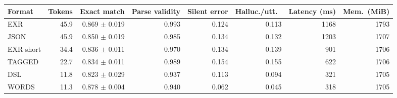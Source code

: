\begin{tabular}{lrrrrrrr}
\toprule
Format & Tokens & Exact match & Parse validity & \textbf{Silent error} & Halluc./utt.\ & Latency (ms) & Mem.\ (MiB) \\
\midrule
EXR & 45.9 & 0.869 {\scriptsize $\pm$ 0.019} & 0.993 & 0.124 & 0.113 & 1168 & 1793 \\
JSON & 45.9 & 0.850 {\scriptsize $\pm$ 0.019} & 0.985 & 0.134 & 0.132 & 1203 & 1707 \\
EXR-short & 34.4 & 0.836 {\scriptsize $\pm$ 0.011} & 0.970 & 0.134 & 0.139 & 901 & 1706 \\
TAGGED & 22.7 & 0.834 {\scriptsize $\pm$ 0.011} & 0.989 & 0.154 & 0.155 & 622 & 1706 \\
DSL & 11.8 & 0.823 {\scriptsize $\pm$ 0.029} & 0.937 & 0.113 & 0.094 & 321 & 1705 \\
WORDS & 11.3 & 0.878 {\scriptsize $\pm$ 0.004} & 0.940 & 0.062 & 0.045 & 318 & 1705 \\
\bottomrule
\end{tabular}
